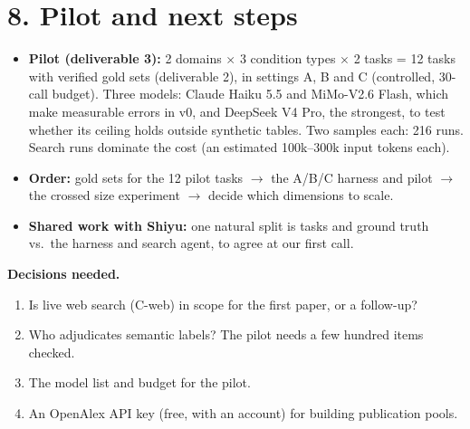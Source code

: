 \documentclass[10pt]{article}
\begin{document}
\section*{8. Pilot and next steps}
\begin{itemize}
\item \textbf{Pilot (deliverable 3):} 2 domains $\times$ 3 condition types $\times$ 2 tasks = 12 tasks with
verified gold sets (deliverable 2), in settings A, B and C (controlled, 30-call budget). Three models: Claude Haiku
5.5 and MiMo-V2.6 Flash, which make measurable errors in v0, and DeepSeek V4 Pro, the strongest, to test whether
its ceiling holds outside synthetic tables. Two samples each: 216 runs. Search runs dominate the cost (an
estimated 100k--300k input tokens each).
\item \textbf{Order:} gold sets for the 12 pilot tasks $\to$ the A/B/C harness and pilot $\to$ the crossed size
experiment $\to$ decide which dimensions to scale.
\item \textbf{Shared work with Shiyu:} one natural split is tasks and ground truth vs.\ the harness and search
agent, to agree at our first call.
\end{itemize}

\textbf{Decisions needed.}
\begin{enumerate}
\item Is live web search (C-web) in scope for the first paper, or a follow-up?
\item Who adjudicates semantic labels? The pilot needs a few hundred items checked.
\item The model list and budget for the pilot.
\item An OpenAlex API key (free, with an account) for building publication pools.
\end{enumerate}
\end{document}
